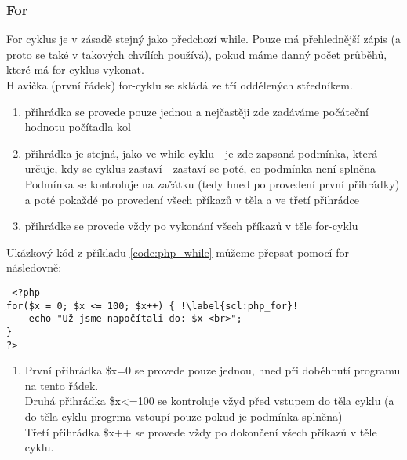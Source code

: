 \subsubsection{For}
For cyklus je v zásadě stejný jako předchozí while. Pouze má přehlednější zápis (a proto se také v takových chvílích používá), pokud máme danný počet průběhů, které má for-cyklus vykonat.\\
Hlavička (první řádek) for-cyklu se skládá ze tří  oddělených středníkem.
\begin{enumerate}
\item přihrádka se provede pouze jednou a nejčastěji zde zadáváme počáteční hodnotu počítadla kol
\item přihrádka je stejná, jako ve while-cyklu - je zde zapsaná podmínka, která určuje, kdy se cyklus zastaví - zastaví se poté, co podmínka není splněna\\
Podmínka se kontroluje na začátku (tedy hned po provedení první přihrádky) a poté pokaždé po provedení všech příkazů v těla a ve třetí přihrádce
\item přihrádke se provede vždy po vykonání všech příkazů v těle for-cyklu
\end{enumerate}
Ukázkový kód z příkladu \ref{code:php_while} můžeme přepsat pomocí for následovně:\\
\begin{minipage}[t]{.45\textwidth}
\begin{code}
\begin{verbatim}
 <?php
for($x = 0; $x <= 100; $x++) { !\label{scl:php_for}!
    echo "Už jsme napočítali do: $x <br>";
}
?> 
\end{verbatim}

\label{code:php_for}
\end{code}
\end{minipage}
\begin{minipage}[t]{.45\textwidth}
\begin{enumerate}
\item[ř. \ref{scl:php_for}:] První přihrádka \$x=0 se provede pouze jednou, hned při doběhnutí programu na tento řádek.\\
Druhá přihrádka \$x<=100 se kontroluje vžyd před vstupem do těla cyklu (a do těla cyklu progrma vstoupí pouze pokud je podmínka splněna)\\
Třetí přihrádka \$x++ se provede vždy po dokončení všech příkazů v těle cyklu. 
\end{enumerate}
\end{minipage}\\


